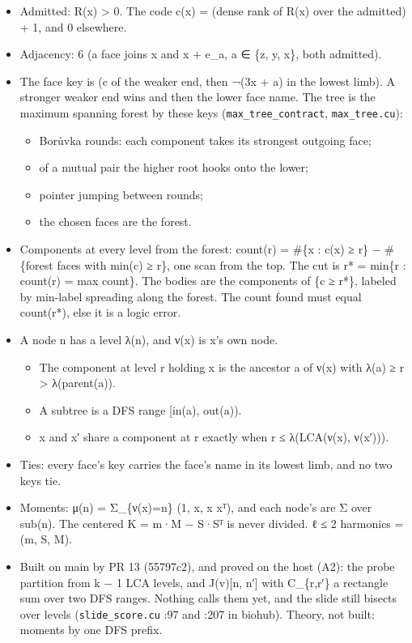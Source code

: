 \begin{itemize}
\item Admitted: R(x) > 0. The code c(x) = (dense rank of R(x) over the admitted) + 1, and 0 elsewhere.
\item Adjacency: 6 (a face joins x and x + e\_\allowbreak{}a, a ∈ \{z, y, x\}, both admitted).
\item The face key is (c of the weaker end, then ¬(3x + a) in the lowest limb). A stronger weaker end wins and then the lower face name. The tree is the maximum spanning forest by these keys (\texttt{max\_\allowbreak{}tree\_\allowbreak{}contract}, \texttt{max\_\allowbreak{}tree.\allowbreak{}cu}):

\begin{itemize}
\item Borůvka rounds: each component takes its strongest outgoing face;
\item of a mutual pair the higher root hooks onto the lower;
\item pointer jumping between rounds;
\item the chosen faces are the forest.
\end{itemize}
\item Components at every level from the forest: count(r) = \#\{x : c(x) ≥ r\} − \#\{forest faces with min(c) ≥ r\}, one scan from the top. The cut is r* = min\{r : count(r) = max count\}. The bodies are the components of \{c ≥ r*\}, labeled by min-label spreading along the forest. The count found must equal count(r*), else it is a logic error.
\item A node n has a level λ(n), and ν(x) is x's own node.

\begin{itemize}
\item The component at level r holding x is the ancestor a of ν(x) with λ(a) ≥ r > λ(parent(a)).
\item A subtree is a DFS range [in(a), out(a)).
\item x and x′ share a component at r exactly when r ≤ λ(LCA(ν(x), ν(x′))).
\end{itemize}
\item Ties: every face's key carries the face's name in its lowest limb, and no two keys tie.
\item Moments: μ(n) = Σ\_\allowbreak{}\{ν(x)=n\} (1, x, x xᵀ), and each node's are Σ over sub(n). The centered K = m·M − S·Sᵀ is never divided. ℓ ≤ 2 harmonics = (m, S, M).
\item Built on main by PR 13 (55797c2), and proved on the host (A2): the probe partition from k − 1 LCA levels, and J(v)[n, n′] with C\_\allowbreak{}\{r,r′\} a rectangle sum over two DFS ranges. Nothing calls them yet, and the slide still bisects over levels (\texttt{slide\_\allowbreak{}score.\allowbreak{}cu} :97 and :207 in biohub). Theory, not built: moments by one DFS prefix.
\end{itemize}

